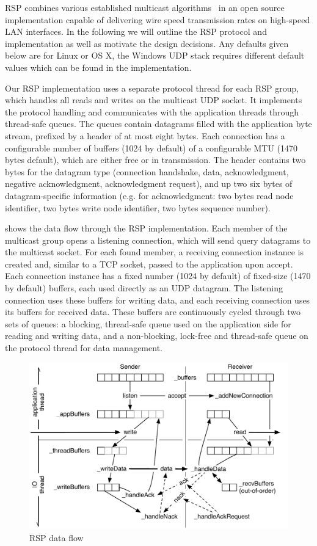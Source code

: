 RSP combines various established multicast
algorithms~\cite{adamson2004negative,Gau:2002} in an open source implementation
capable of delivering wire speed transmission rates on high-speed LAN
interfaces. In the following we will outline the RSP protocol and implementation
as well as motivate the design decisions. Any defaults given below are for Linux
or OS X, the Windows UDP stack requires different default values which can be
found in the implementation.

Our RSP implementation uses a separate protocol thread for each RSP group, which
handles all reads and writes on the multicast UDP socket. It implements the
protocol handling and communicates with the application threads through
thread-safe queues. The queues contain datagrams filled with the application
byte stream, prefixed by a header of at most eight bytes. Each connection has a
configurable number of buffers (1024 by default) of a configurable MTU (1470
bytes default), which are either free or in transmission. The header contains
two bytes for the datagram type (connection handshake, data, acknowledgment,
negative acknowledgment, acknowledgment request), and up two six bytes of
datagram-specific information (e.g. for acknowledgment: two bytes read node
identifier, two bytes write node identifier, two bytes sequence number).

 shows the data flow through the RSP implementation. Each member of
the multicast group opens a listening connection, which will send query
datagrams to the multicast socket. For each found member, a receiving
connection instance is created and, similar to a TCP socket, passed to the
application upon \textsf{accept}. Each connection instance has a fixed number
(1024 by default) of fixed-size (1470 by default) buffers, each used directly
as an UDP datagram. The listening connection uses these buffers for writing
data, and each receiving connection uses its buffers for received data. These
buffers are continuously cycled through two sets of queues: a blocking,
thread-safe queue used on the application side for reading and writing data,
and a non-blocking, lock-free and thread-safe queue on the protocol thread for
data management.

\begin{figure}[h!t]\center
  \includegraphics[width=\textwidth]{images/rspPackets.pdf}
  {\caption{\label{fRSP}RSP data flow}}
\end{figure}

